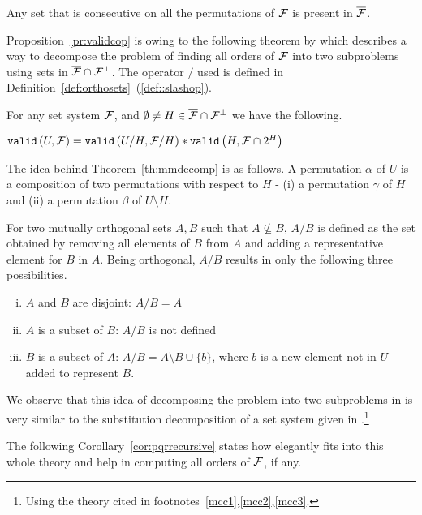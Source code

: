 \begin{proposition}
  \label{pr:validcop}
  Any set that is consecutive on all the \COP permutations of ${\cal F}$ is
  present in $\overline{{\cal F}}$.
\end{proposition}

Proposition~\ref{pr:validcop} is owing to the following theorem by
which \cite{mm96} describes a way to decompose the problem of finding
all \COP orders of ${\cal F}$ into two subproblems using sets in
$\overline{{\cal F}} \cap {\cal F}^{\bot}$. The operator $/$ used is defined in
Definition~\ref{def:orthosets}~(\ref{def::slashop}).

\begin{theoremsansproof}[{\cite[Th.~7]{mm96}}]
  \label{th:mmdecomp}
  For any set system ${\cal F}$, and $\emptyset \ne H \in \overline{{\cal F}}
  \cap {\cal F}^{\bot}$ we have the following.\par
  \centering
  ${\tt valid}\left(U,{\cal F}\right) = {\tt valid}\left(U/H,{\cal F}/H\right) * {\tt valid}\left(H,{\cal F} \cap 2^H\right)$
\end{theoremsansproof}


\def \ff {\overline{\cF} \cap \cF^{\bot}}
The idea behind Theorem~\ref{th:mmdecomp} is as follows. A permutation $\alpha$
of $U$ is a composition of two permutations with respect to $H$ - (i) a
permutation $\gamma$ of $H$ and (ii) a permutation $\beta$ of $U
\setminus H$.

For two mutually orthogonal sets $A, B$ such that $A \nsubseteq B$,
$A/B$ is defined as the set obtained by removing all elements of $B$
from $A$ and adding a representative element for $B$ in $A$. Being orthogonal,
$A/B$ results in only the following three possibilities.
\begin{enumerate}[i. ]
\item $A$ and $ B$ are disjoint: $A/B  = A$
\item $A$ is a subset of $B$: $A/B$ is not defined
\item $B$ is a subset of $A$: $A/B = A \setminus B \cup \{b\}$, where $b$
is a new element not in $U$ added to represent $B$.
\end{enumerate}

We observe that this idea of decomposing the \COP problem into two
subproblems in \cite{mm96} is very similar to the substitution
decomposition of a set system given in \cite[Sec.~4]{mcc04}.\footnote{Using
  the theory cited in footnotes~\ref{mcc1},\ref{mcc2},\ref{mcc3}.}

The following Corollary~\ref{cor:pqrrecursive} states how
\PQRtree elegantly fits into this whole theory and help in computing
all \COP orders of ${\cal F}$, if any.

